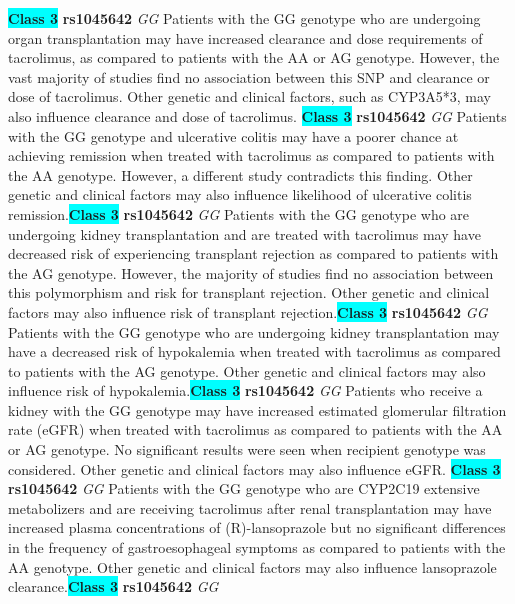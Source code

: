 \documentclass{report}
\begin{document}
\textbf{\colorbox{cyan} {Class 3}} \textbf{ rs1045642 } \textit{ GG }
Patients with the GG genotype who are undergoing organ transplantation may have increased clearance and dose requirements of tacrolimus, as compared to patients with the AA or AG genotype. However, the vast majority of studies find no association between this SNP and clearance or dose of tacrolimus. Other genetic and clinical factors, such as CYP3A5*3, may also influence clearance and dose of tacrolimus. \newline\textbf{\colorbox{cyan} {Class 3}} \textbf{ rs1045642 } \textit{ GG }
Patients with the GG genotype and ulcerative colitis may have a poorer chance at achieving remission when treated with tacrolimus as compared to patients with the AA genotype. However, a different study contradicts this finding. Other genetic and clinical factors may also influence likelihood of ulcerative colitis remission.\newline\textbf{\colorbox{cyan} {Class 3}} \textbf{ rs1045642 } \textit{ GG }
Patients with the GG genotype who are undergoing kidney transplantation and are treated with tacrolimus may have decreased risk of experiencing transplant rejection as compared to patients with the AG genotype. However, the majority of studies find no association between this polymorphism and risk for transplant rejection. Other genetic and clinical factors may also influence risk of transplant rejection.\newline\textbf{\colorbox{cyan} {Class 3}} \textbf{ rs1045642 } \textit{ GG }
Patients with the GG genotype who are undergoing kidney transplantation may have a decreased risk of hypokalemia when treated with tacrolimus as compared to patients with the AG genotype. Other genetic and clinical factors may also influence risk of hypokalemia.\newline\textbf{\colorbox{cyan} {Class 3}} \textbf{ rs1045642 } \textit{ GG }
Patients who receive a kidney with the GG genotype may have increased estimated glomerular filtration rate (eGFR) when treated with tacrolimus as compared to patients with the AA or AG genotype. No significant results were seen when recipient genotype was considered. Other genetic and clinical factors may also influence eGFR. \newline\textbf{\colorbox{cyan} {Class 3}} \textbf{ rs1045642 } \textit{ GG }
Patients with the GG genotype who are CYP2C19 extensive metabolizers and are receiving tacrolimus after renal transplantation may have increased plasma concentrations of (R)-lansoprazole but no significant differences in the frequency of gastroesophageal symptoms as compared to patients with the AA genotype. Other genetic and clinical factors may also influence lansoprazole clearance.\newline\textbf{\colorbox{cyan} {Class 3}} \textbf{ rs1045642 } \textit{ GG }
\end{document}

